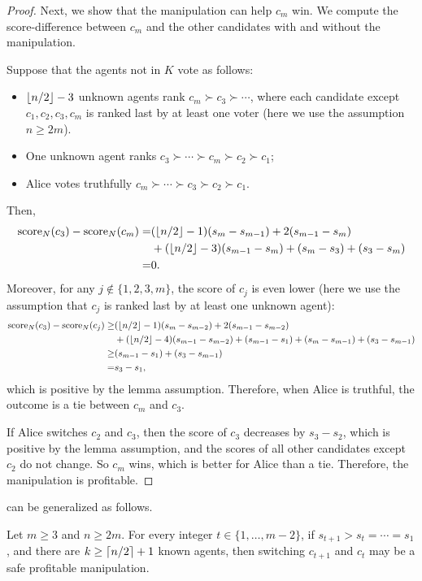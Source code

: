 \begin{proof}
Next, we show that the manipulation can help $c_m$ win. We compute the score-difference between $c_m$ and the other candidates with and without the manipulation. 

Suppose that the agents not in $K$ vote as follows:
\begin{itemize}
\item $\left\lfloor n/2 \right\rfloor-3$ unknown agents rank $c_m\succ c_3\succ \cdots $,
where each candidate except $c_1,c_2,c_3,c_m$ is ranked last by at least one voter (here we use the assumption $n\geq 2m$).
\item One unknown agent ranks 
$c_3\succ \cdots \succ c_m \succ c_2 \succ c_1$;
\item Alice votes truthfully $c_m\succ  \cdots \succ c_3 \succ c_2 \succ c_1$.  
\end{itemize}
Then,
\begin{align*}
\operatorname{score}_N(c_3) - \operatorname{score}_N(c_m)
=&
(\left\lfloor n/2 \right\rfloor-1)(s_{m}-s_{m-1}) 
+ 2(s_{m-1}-s_{m})
\\
&+
(\left\lfloor n/2 \right\rfloor-3)(s_{m-1}-s_{m}) 
+ (s_m-s_3)
+ (s_3-s_m)
\\
=&
0.
\end{align*}
Moreover, for any $j\not\in\{1,2,3,m\}$, the score of $c_j$ is even lower (here we use the assumption that $c_j$ is ranked last by at least one unknown agent):
\begin{align*}
\operatorname{score}_N(c_3) - \operatorname{score}_N(c_j)
\geq &
(\left\lfloor n/2 \right\rfloor-1)(s_{m}-s_{m-2}) 
+ 2(s_{m-1}-s_{m-2})
\\
&+
(\left\lfloor n/2 \right\rfloor-4)(s_{m-1}-s_{m-2}) 
+ (s_{m-1}-s_1)
+ (s_m-s_{m-1})
+ (s_3-s_{m-1})
\\
\geq & (s_{m-1}-s_{1})
+ (s_3-s_{m-1})
\\
= & s_3 - s_1,
\end{align*}
which is positive by the lemma assumption.
Therefore, when Alice is truthful, the outcome is a tie between $c_m$ and $c_3$.

If Alice switches $c_2$ and $c_3$, then the score of $c_3$ decreases by $s_3-s_2$, which is positive by the lemma assumption, and the scores of all other candidates except $c_2$ do not change. So $c_m$ wins, which is better for Alice than a tie.
Therefore, the manipulation is profitable.
\end{proof}
\fi

 can be generalized as follows. 

\begin{lemmarep}
\label{lem:st1>st}
Let $m\geq 3$ and $n\geq 2m$.
For every integer $t \in \{1,\ldots, m-2\}$,
if $s_{t+1} > s_t = \cdots = s_1$,
and there are $k\geq \left\lceil n/2 \right\rceil+1$ known agents,
then switching $c_{t+1}$ and $c_t$ may be a safe profitable manipulation.
\end{lemmarep}

